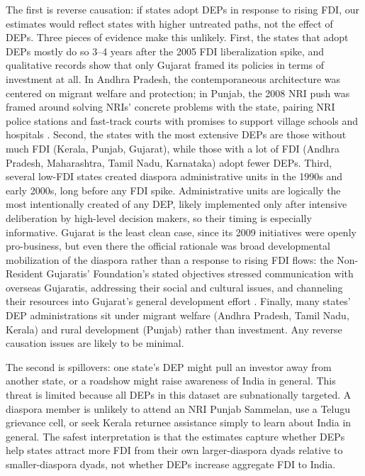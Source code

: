 \documentclass[12pt]{article}
\begin{document}
The first is reverse causation: if states adopt DEPs in response to rising FDI, our estimates would reflect states with higher untreated paths, not the effect of DEPs. Three pieces of evidence make this unlikely. First, the states that adopt DEPs mostly do so 3--4 years after the 2005 FDI liberalization spike, and qualitative records show that only Gujarat framed its policies in terms of investment at all. In Andhra Pradesh, the contemporaneous architecture was centered on migrant welfare and protection; in Punjab, the 2008 NRI push was framed around solving NRIs' concrete problems with the state, pairing NRI police stations and fast-track courts with promises to support village schools and hospitals \citep{society_andhra_nodate, noauthor_nri_nodate}. Second, the states with the most extensive DEPs are those without much FDI (Kerala, Punjab, Gujarat), while those with a lot of FDI (Andhra Pradesh, Maharashtra, Tamil Nadu, Karnataka) adopt fewer DEPs. Third, several low-FDI states created diaspora administrative units in the 1990s and early 2000s, long before any FDI spike. Administrative units are logically the most intentionally created of any DEP, likely implemented only after intensive deliberation by high-level decision makers, so their timing is especially informative. Gujarat is the least clean case, since its 2009 initiatives were openly pro-business, but even there the official rationale was broad developmental mobilization of the diaspora rather than a response to rising FDI flows: the Non-Resident Gujaratis' Foundation's stated objectives stressed communication with overseas Gujaratis, addressing their social and cultural issues, and channeling their resources into Gujarat's general development effort \citep{noauthor_home_nodate}. Finally, many states' DEP administrations sit under migrant welfare (Andhra Pradesh, Tamil Nadu, Kerala) and rural development (Punjab) rather than investment. Any reverse causation issues are likely to be minimal.

The second is spillovers: one state's DEP might pull an investor away from another state, or a roadshow might raise awareness of India in general. This threat is limited because all DEPs in this dataset are subnationally targeted. A diaspora member is unlikely to attend an NRI Punjab Sammelan, use a Telugu grievance cell, or seek Kerala returnee assistance simply to learn about India in general. The safest interpretation is that the estimates capture whether DEPs help states attract more FDI from their own larger-diaspora dyads relative to smaller-diaspora dyads, not whether DEPs increase aggregate FDI to India.
\end{document}
